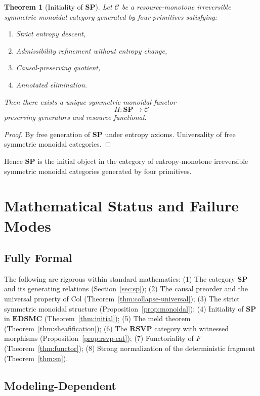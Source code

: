 \documentclass[12pt,a4paper]{article}
\newtheorem{theorem}{Theorem}[section]
\theoremstyle{definition}
\theoremstyle{remark}
\newcommand{\SP}{\mathbf{SP}}
\newcommand{\RSVP}{\mathbf{RSVP}}
\newcommand{\EDSMC}{\mathbf{EDSMC}}
\newcommand{\Col}{\mathrm{Col}}
\begin{document}
\begin{theorem}[Initiality of $\SP$]
Let $\mathcal{C}$ be a resource-monotone irreversible symmetric monoidal
category generated by four primitives satisfying:
\begin{enumerate}
  \item Strict entropy descent,
  \item Admissibility refinement without entropy change,
  \item Causal-preserving quotient,
  \item Annotated elimination.
\end{enumerate}
Then there exists a unique symmetric monoidal functor
\[
  H : \SP \to \mathcal{C}
\]
preserving generators and resource functional.
\end{theorem}

\begin{proof}
By free generation of $\SP$ under entropy axioms.
Universality of free symmetric monoidal categories.
\end{proof}

Hence $\SP$ is the initial object in the category of entropy-monotone
irreversible symmetric monoidal categories generated by four primitives.


\section{Mathematical Status and Failure Modes}
\label{sec:status}

\subsection{Fully Formal}

The following are rigorous within standard mathematics:
(1) The category $\SP$ and its generating relations (Section~\ref{sec:sp});
(2) The causal preorder and the universal property of $\Col$ (Theorem~\ref{thm:collapse-universal});
(3) The strict symmetric monoidal structure (Proposition~\ref{prop:monoidal});
(4) Initiality of $\SP$ in $\EDSMC$ (Theorem~\ref{thm:initial});
(5) The meld theorem (Theorem~\ref{thm:sheafification});
(6) The $\RSVP$ category with witnessed morphisms (Proposition~\ref{prop:rsvp-cat});
(7) Functoriality of $F$ (Theorem~\ref{thm:functor});
(8) Strong normalization of the deterministic fragment (Theorem~\ref{thm:sn}).

\subsection{Modeling-Dependent}
\end{document}
